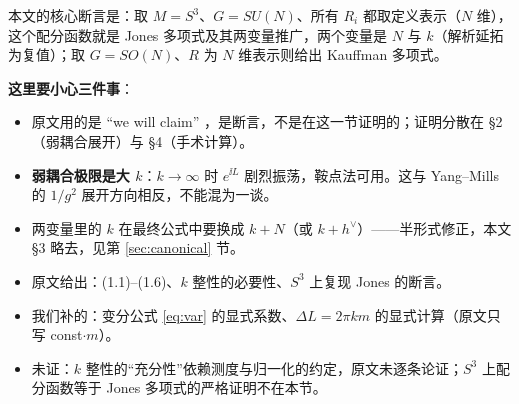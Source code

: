 本文的核心断言是：取 $M=S^3$、$G=SU(N)$、所有 $R_i$ 都取定义表示（$N$ 维），这个配分函数就是 Jones 多项式及其两变量推广，两个变量是 $N$ 与 $k$（解析延拓为复值）；取 $G=SO(N)$、$R$ 为 $N$ 维表示则给出 Kauffman 多项式。

\textbf{这里要小心三件事}：
\begin{itemize}[leftmargin=1.6em]
\item 原文用的是 “we will claim” ，是断言，不是在这一节证明的；证明分散在 §2（弱耦合展开）与 §4（手术计算）。
\item \textbf{弱耦合极限是大 $k$}：$k\to\infty$ 时 $e^{\ii L}$ 剧烈振荡，鞍点法可用。这与 Yang--Mills 的 $1/g^2$ 展开方向相反，不能混为一谈。
\item 两变量里的 $k$ 在最终公式中要换成 $k+N$（或 $k+h^\vee$）——半形式修正，本文 §3 略去，见第 \ref{sec:canonical} 节。
\end{itemize}

\begin{boundary}
\begin{itemize}[leftmargin=1.4em]
\item 原文给出：(1.1)--(1.6)、$k$ 整性的必要性、$S^3$ 上复现 Jones 的断言。
\item 我们补的：变分公式 \eqref{eq:var} 的显式系数、$\Delta L=2\pi k m$ 的显式计算（原文只写 const$\cdot m$）。
\item 未证：$k$ 整性的“充分性”依赖测度与归一化的约定，原文未逐条论证；$S^3$ 上配分函数等于 Jones 多项式的严格证明不在本节。
\end{itemize}
\end{boundary}
